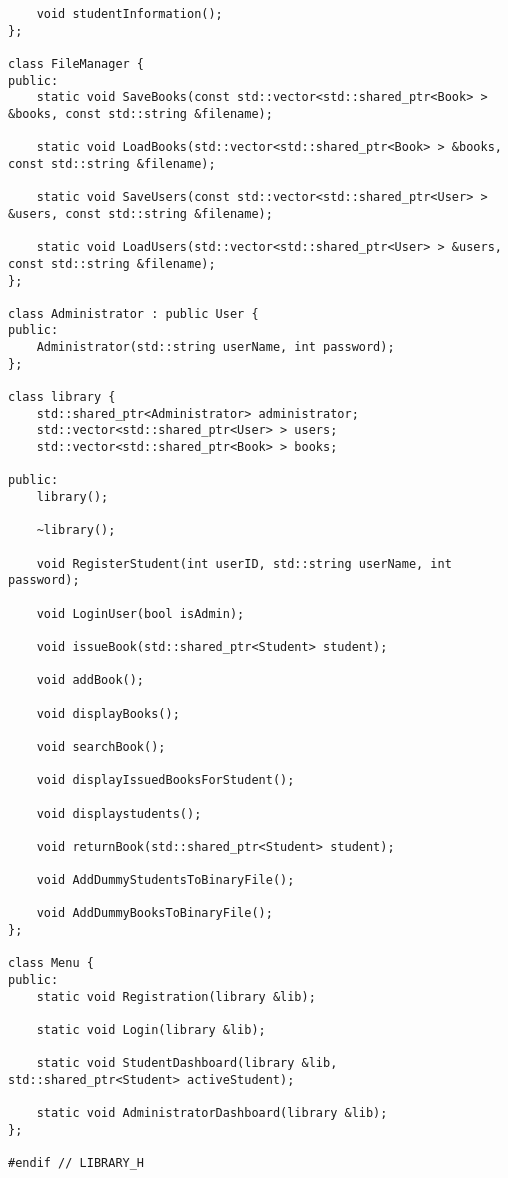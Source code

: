 \documentclass[12pt,a4paper]{report}
\begin{document}
\begin{verbatim}
    void studentInformation();
};

class FileManager {
public:
    static void SaveBooks(const std::vector<std::shared_ptr<Book> > &books, const std::string &filename);

    static void LoadBooks(std::vector<std::shared_ptr<Book> > &books, const std::string &filename);

    static void SaveUsers(const std::vector<std::shared_ptr<User> > &users, const std::string &filename);

    static void LoadUsers(std::vector<std::shared_ptr<User> > &users, const std::string &filename);
};

class Administrator : public User {
public:
    Administrator(std::string userName, int password);
};

class library {
    std::shared_ptr<Administrator> administrator;
    std::vector<std::shared_ptr<User> > users;
    std::vector<std::shared_ptr<Book> > books;

public:
    library();

    ~library();

    void RegisterStudent(int userID, std::string userName, int password);

    void LoginUser(bool isAdmin);

    void issueBook(std::shared_ptr<Student> student);

    void addBook();

    void displayBooks();

    void searchBook();

    void displayIssuedBooksForStudent();

    void displaystudents();

    void returnBook(std::shared_ptr<Student> student);

    void AddDummyStudentsToBinaryFile();

    void AddDummyBooksToBinaryFile();
};

class Menu {
public:
    static void Registration(library &lib);

    static void Login(library &lib);

    static void StudentDashboard(library &lib, std::shared_ptr<Student> activeStudent);

    static void AdministratorDashboard(library &lib);
};

#endif // LIBRARY_H

\end{verbatim}
\end{document}
